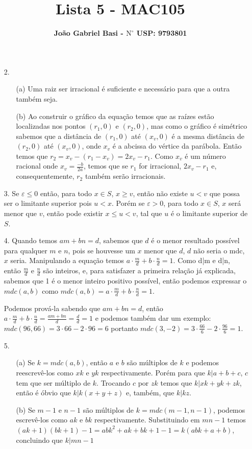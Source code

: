 \documentclass[12pt, a4paper]{article} %
\title{ \textbf{Lista 5 - MAC105}}
\date{}
\author{ \textbf{João Gabriel Basi - $\text{N}^\circ$ USP: 9793801}}
\begin{document}
\maketitle
\begin{enumerate}
\item[2.]
\begin{enumerate}
\item[(a)]
Uma raiz ser irracional é suficiente e necessário para que a outra também seja.
\item[(b)]
Ao construir o gráfico da equação temos que as raízes estão localizadas nos pontos $(r_1, 0)$ e $(r_2, 0)$, mas como o gráfico é simétrico sabemos que a distância de $(r_1, 0)$ até $(x_v, 0)$ é a mesma distância de $(r_2, 0)$ até $(x_v, 0)$, onde $x_v$ é a abcissa do vértice da parábola. Então temos que $r_2 = x_v - (r_1-x_v) = 2x_v-r_1$. Como $x_v$ é um número racional onde $x_v=\frac{-b}{2a}$, temos que se $r_1$ for irracional, $2x_v-r_1$ e, consequentemente, $r_2$ também serão irracionais.
\end{enumerate}
\item[3.]
Se $\varepsilon\leqslant0$ então, para todo $x\in S$, $x\geqslant v$, então não existe $u<v$ que possa ser o limitante superior pois $u<x$. Porém se $\varepsilon>0$, para todo $x\in S$, $x$ será menor que $v$, então pode existir $x\leqslant u<v$, tal que $u$ é o limitante superior de $S$.
\item[4.]
Quando temos $am+bn=d$, sabemos que $d$ é o menor resultado possível para qualquer $m$ e $n$, pois se houvesse um $x$ menor que $d$, $d$ não seria o mdc, $x$ seria. Manipulando a equação temos $a\cdot\frac{m}{d}+b\cdot\frac{n}{d}=1$. Como d|m e d|n, então $\frac{m}{d}$ e $\frac{n}{d}$ são inteiros, e, para satisfazer a primeira relação já explicada, sabemos que 1 é o menor inteiro positivo possível, então podemos expressar o $mdc(a,b)$ como $mdc(a,b)=a\cdot\frac{m}{d}+b\cdot\frac{n}{d}=1$.

Podemos prová-la sabendo que $am+bn=d$, então $a\cdot\frac{m}{d}+b\cdot\frac{n}{d}=\frac{am+bn}{d}=\frac{d}{d}=1$ e podemos também dar um exemplo:  $mdc(96,66)=3\cdot66-2\cdot96=6$ portanto $mdc(3,-2)=3\cdot\frac{66}{6}-2\cdot\frac{96}{6}=1$.
\item[5.]
\begin{enumerate}
\item[(a)]
Se $k=mdc(a,b)$, então $a$ e $b$ são múltiplos de $k$ e podemos reescrevê-los como $xk$ e $yk$ respectivamente. Porém para que $k|a+b+c$, $c$ tem que ser múltiplo de $k$. Trocando $c$ por $zk$ temos que $k|xk+yk+zk$, então é óbvio que $k|k(x+y+z)$ e, também, que $k|kz$.
\item[(b)]
Se $m-1$ e $n-1$ são múltiplos de $k=mdc(m-1,n-1)$, podemos escrevê-los como $ak$ e $bk$ respectivamente. Substituindo em $mn-1$ temos $(ak+1)(bk+1)-1=abk^2+ak+bk+1-1=k(abk+a+b)$, concluindo que $k|mn-1$
\end{enumerate}
\end{enumerate}
\end{document}
